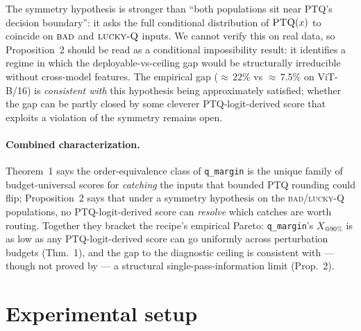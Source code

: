 \documentclass{article}
\makeatletter
\newcommand{\ptq}{\textsc{PTQ}\xspace}
\newcommand{\bad}{\textsc{bad}\xspace}
\newcommand{\luckyq}{\textsc{lucky-Q}\xspace}
\newcommand{\xat}[1]{\ensuremath{X_{@#1\%}}}
\makeatother
\begin{document}
The symmetry hypothesis is stronger than ``both populations sit near \ptq's decision boundary'': it asks the full conditional distribution of $\ptq(x)$ to coincide on $\bad$ and $\luckyq$ inputs. We cannot verify this on real data, so Proposition~2 should be read as a conditional impossibility result: it identifies a regime in which the deployable-vs-ceiling gap would be structurally irreducible without cross-model features. The empirical gap ($\approx$\,22\% vs $\approx$\,7.5\% on ViT-B/16) is \emph{consistent with} this hypothesis being approximately satisfied; whether the gap can be partly closed by some cleverer \ptq-logit-derived score that exploits a violation of the symmetry remains open.

\paragraph{Combined characterization.}
Theorem~1 says the order-equivalence class of \texttt{q\_margin} is the unique family of budget-universal scores for \emph{catching} the inputs that bounded \ptq{} rounding could flip; Proposition~2 says that under a symmetry hypothesis on the \bad{}/\luckyq{} populations, no \ptq-logit-derived score can \emph{resolve} which catches are worth routing. Together they bracket the recipe's empirical Pareto: \texttt{q\_margin}'s \xat{90} is as low as any \ptq-logit-derived score can go uniformly across perturbation budgets (Thm.~1), and the gap to the diagnostic ceiling is consistent with --- though not proved by --- a structural single-pass-information limit (Prop.~2).

\section{Experimental setup}\label{sec:setup}
\end{document}
